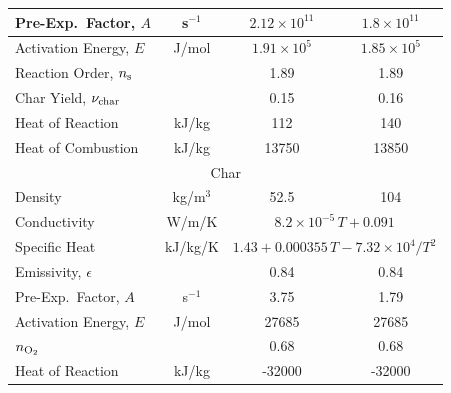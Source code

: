 \begin{table}[h!]
\begin{center}
\begin{tabular}{|l|c|c|c|}
Pre-Exp.~Factor, $A$         & s$^{-1}$      & $2.12 \times 10^{11}$           & $1.8 \times 10^{11}$              \\ \hline
Activation Energy, $E$       & J/mol         & $1.91 \times 10^{5}$            & $1.85 \times 10^{5}$              \\ \hline
Reaction Order, $n_{\rm s}$  &               & 1.89                            & 1.89                              \\ \hline
Char Yield, $\nu_{\rm char}$ &               & 0.15                            & 0.16                              \\ \hline
Heat of Reaction             & kJ/kg         & 112                             & 140                               \\ \hline
Heat of Combustion           & kJ/kg         & 13750                           & 13850                             \\ \hline
\multicolumn{4}{|c|}{Char}                                                                                         \\ \hline
Density                      & kg/m$^3$      & 52.5                            & 104                               \\ \hline
Conductivity                 & W/m/K         & \multicolumn{2}{|c|}{$8.2\times 10^{-5}\, T+0.091$}                 \\ \hline
Specific Heat                & kJ/kg/K       & \multicolumn{2}{|c|}{$1.43+0.000355\,T-7.32\times 10^4/T^2$}        \\ \hline
Emissivity, $\epsilon$       &               & 0.84                            & 0.84                              \\ \hline
Pre-Exp.~Factor, $A$         & s$^{-1}$      & 3.75                            & 1.79                              \\ \hline
Activation Energy, $E$       & J/mol         & 27685                           & 27685                             \\ \hline
$n_{\rm O_2}$                &               & 0.68                            & 0.68                              \\ \hline
Heat of Reaction             & kJ/kg         & -32000                          & -32000                            \\ \hline
\end{tabular}
\end{center}
\label{Aalto_Woods_Properties}
\end{table}


